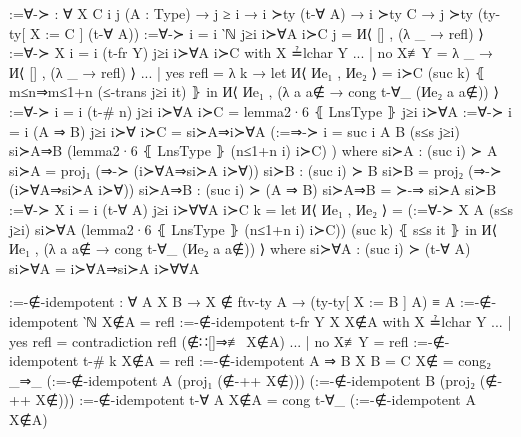 \documentclass[logo,bsc,singlespacing,parskip,online]{infthesis}
\renewenvironment{code}{\mintedcopy[breaklines,breaksymbolleft=\;]{agda}}{\endmintedcopy}
\begin{document}
\begin{code}
  :=∀-≻ : ∀ {X C i j} (A : Type) → j ≥ i → i ≻ty (t-∀ A) → i ≻ty C → j ≻ty (ty-ty[ X := C ] (t-∀ A))
  :=∀-≻ {i = i} ‵ℕ j≥i i≻∀A i≻C j = И⟨ [] , (λ _ → refl) ⟩
  :=∀-≻ {X} {i = i} (t-fr Y) j≥i i≻∀A i≻C with X ≟lchar Y
  ... | no  X≢Y  = λ _ → И⟨ [] , (λ _ → refl) ⟩
  ... | yes refl = λ k →
    let И⟨ Иe₁ , Иe₂ ⟩ = i≻C (suc k) ⦃ m≤n⇒m≤1+n (≤-trans j≥i it) ⦄
    in И⟨ Иe₁ , (λ a {a∉} → cong t-∀_ (Иe₂ a {a∉})) ⟩
  :=∀-≻ {i = i} (t-# n) j≥i i≻∀A i≻C = lemma2·6 ⦃ LnsType ⦄ j≥i i≻∀A
  :=∀-≻ {i = i} (A ⇒ B) j≥i i≻∀ i≻C = si≻A⇒i≻∀A (:=⇒-≻ {i = suc i} A B (s≤s j≥i) si≻A⇒B (lemma2·6 ⦃ LnsType ⦄ (n≤1+n i) i≻C) )
    where
      si≻A : (suc i) ≻ A
      si≻A = proj₁ (⇒-≻ (i≻∀A⇒si≻A i≻∀))
      si≻B : (suc i) ≻ B
      si≻B = proj₂ (⇒-≻ (i≻∀A⇒si≻A i≻∀))
      si≻A⇒B : (suc i) ≻ (A ⇒ B)
      si≻A⇒B = ≻-⇒ si≻A si≻B
  :=∀-≻ {X} {i = i} (t-∀ A) j≥i i≻∀∀A i≻C k =
    let И⟨ Иe₁ , Иe₂ ⟩ = (:=∀-≻ {X} A (s≤s j≥i) si≻∀A (lemma2·6 ⦃ LnsType ⦄ (n≤1+n i) i≻C)) (suc k) ⦃ s≤s it ⦄
    in И⟨ Иe₁ , (λ a {a∉} → cong t-∀_ (Иe₂ a {a∉})) ⟩
    where
      si≻∀A : (suc i) ≻ (t-∀ A)
      si≻∀A = i≻∀A⇒si≻A i≻∀∀A

  :=-∉-idempotent : ∀ {A X B} → X ∉ ftv-ty A → (ty-ty[ X := B ] A) ≡ A
  :=-∉-idempotent {‵ℕ} X∉A = refl
  :=-∉-idempotent {t-fr Y} {X} X∉A with X ≟lchar Y
  ... | yes refl = contradiction refl (∉∷[]⇒≢ X∉A)
  ... | no  X≢Y  = refl
  :=-∉-idempotent {t-# k} X∉A = refl
  :=-∉-idempotent {A ⇒ B} {X} {B = C} X∉ = cong₂ _⇒_
    (:=-∉-idempotent {A} (proj₁ (∉-++ X∉)))
    (:=-∉-idempotent {B} (proj₂ (∉-++ X∉)))
  :=-∉-idempotent {t-∀ A} X∉A = cong t-∀_ (:=-∉-idempotent {A} X∉A)
\end{code}
\end{document}
